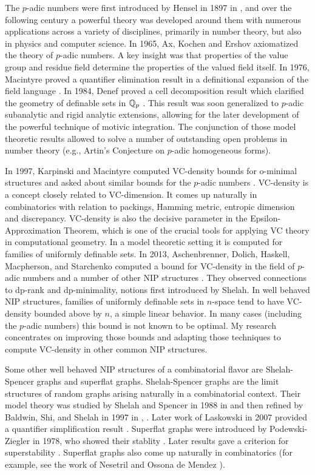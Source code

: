The $p$-adic numbers were first introduced by Hensel in 1897 in \cite{hensel}, and over the following century a powerful theory was developed around them with numerous applications across a variety of disciplines, primarily in number theory, but also in physics and computer science.
In 1965, Ax, Kochen \cite{ak1} and Ershov \cite{er1} axiomatized the theory of $p$-adic numbers. 
A key insight was that properties of the value group and residue field determine the properties of the valued field itself.
In 1976, Macintyre proved a quantifier elimination result in a definitional expansion of the field language \cite{mac76}.
In 1984, Denef proved a cell decomposition result which clarified the geometry of definable sets in $\mathbb{Q}_p$ \cite{den84}.
This result was soon generalized to $p$-adic subanalytic and rigid analytic extensions, allowing for the later development of the powerful technique of motivic integration.
The conjunction of those model theoretic results allowed to solve a number of outstanding open problems in number theory (e.g., Artin's Conjecture on $p$-adic homogeneous forms).

In 1997, Karpinski and Macintyre computed VC-density bounds for o-minimal structures and asked about similar bounds for the $p$-adic numbers \cite{karp97}.
VC-density is a concept closely related to VC-dimension.
It comes up naturally in combinatorics with relation to packings, Hamming metric, entropic dimension and discrepancy.
 VC-density is also the decisive parameter in the Epsilon-Approximation Theorem, which is one of the crucial tools for applying VC theory in computational geometry.
In a model theoretic setting it is computed for families of uniformly definable sets.
 In 2013, Aschenbrenner, Dolich, Haskell, Macpherson, and Starchenko computed a bound for VC-density in the field of $p$-adic numbers and a number of other NIP structures \cite{density}.
They observed connections to dp-rank and dp-minimality, notions first introduced by Shelah.
In well behaved NIP structures, families of uniformly definable sets in $n$-space
tend to have VC-density bounded above by $n$, a simple linear behavior.
In many cases (including the $p$-adic numbers) this bound is not known to be optimal.
My research concentrates on improving those bounds and adapting those techniques to compute VC-density in other common NIP structures.

Some other well behaved NIP structures of a combinatorial flavor are Shelah-Spencer graphs and superflat graphs.
Shelah-Spencer graphs are the limit structures of random graphs arising naturally in a combinatorial context.
Their model theory was studied by Shelah and Spencer in 1988 in \cite{spencer}
and then refined by Baldwin, Shi, and Shelah in 1997 in \cite{shi}, \cite{baldwin}.
Later work of Laskowski in 2007 provided a quantifier simplification result \cite{laskowski}.
Superflat graphs were introduced by Podewski-Ziegler in 1978, who showed their stablity \cite{stable_graphs}.
Later results gave a criterion for superstability \cite{ultraflat}.
Superflat graphs also come up naturally in combinatorics (for example, see the work of Nesetril and Ossona de Mendez \cite{nowhere}).

